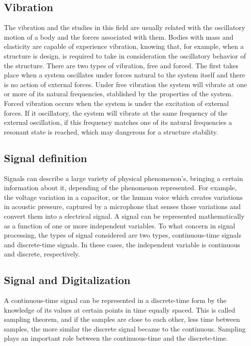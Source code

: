 \subsection{Vibration}
The vibration and the studies in this field are usually related with the oscillatory motion of a body and the forces associated with them. Bodies with mass and elasticity are capable of experience vibration, knowing that, for example, when a structure is design, is required to take in consideration the oscillatory behavior of the structure. There are two types of vibration, free and forced. The first takes place when a system oscillates under forces natural to the system itself and there is no action of external forces. Under free vibration the system will vibrate at one or more of its natural frequencies, stablished by the properties of the system. Forced vibration occurs when the system is under the excitation of external forces. If it oscillatory, the system will vibrate at the same frequency of the external oscillation, if this frequency matches one of its natural frequencies a resonant state is reached, which may dangerous for a structure stability.   

\subsection{Signal definition}
Signals can describe a large variety of physical phenomenon's, bringing a certain information about it, depending of the phenomenon represented. For example, the voltage variation in a capacitor, or the human voice which creates variations in acoustic pressure, captured by a microphone that senses those variations and convert them into a electrical signal. A signal can be represented mathematically as a function of one or more independent variables. 
To what concern in signal processing, the types of signal considered are two types, continuous-time signals and discrete-time signals. In these cases, the independent variable is continuous and discrete, respectively\cite{oppenheimSignalsSystems1997}.

\subsection{Signal and Digitalization}
A continuous-time signal can be represented in a discrete-time form by the knowledge of its values at certain points in time equally spaced. This is called sampling theorem, and if the samples are close to each other, less time between samples, the more similar the discrete signal became to the continuous. Sampling plays an important role between the continuous-time and the discrete-time.

